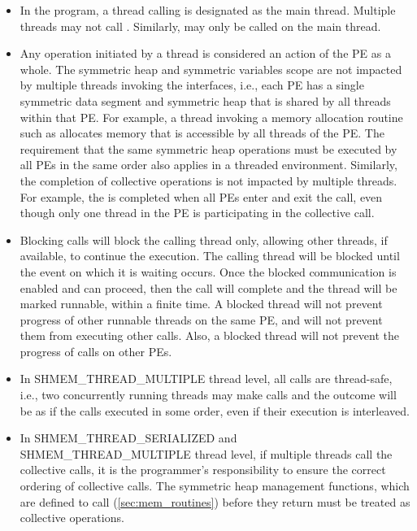 \begin{itemize}[leftmargin=*]

\item
In the \openshmem{} program, a thread calling  is designated as the main
thread. Multiple threads may not call . Similarly,
 may only be called on the main thread.

\item
Any \openshmem{} operation initiated by a thread is considered an action of the \ac{PE} as a whole.
The symmetric heap and symmetric variables scope
are not impacted by multiple threads invoking the
\openshmem{} interfaces, i.e., 
each \ac{PE} has a single symmetric data segment and symmetric heap that is shared by
all threads within that \ac{PE}.  For example, a thread invoking a memory allocation
routine such as  
allocates memory that is accessible by all threads of the \ac{PE}. 
The requirement that the same symmetric heap operations must
be executed by all \acp{PE} in the same order also applies in a threaded
environment. Similarly, the completion of collective operations is not impacted by multiple threads. 
For example, the  is completed when all \acp{PE} enter and
exit the  call, even though only one thread in the \ac{PE} is
participating in the collective call. 

\item Blocking \openshmem{} calls will block the calling thread only, allowing
other threads, if available, to continue the execution. The calling thread will be blocked until the
event on which it is waiting occurs. Once the blocked communication is enabled
and can proceed, then the call will complete and the thread will be marked
runnable, within a finite time. A blocked thread will not prevent progress of
other runnable threads on the same \ac{PE}, and will not prevent them from
executing other \openshmem{} calls. Also, a blocked thread will not prevent the
progress of \openshmem{} calls on other \acp{PE}. 

\item In SHMEM\_THREAD\_MULTIPLE thread level, all \openshmem{} calls are thread-safe, 
i.e., two concurrently running threads may make \openshmem{} calls and the outcome will be as if the calls executed in
some order, even if their execution is interleaved.


\item
In SHMEM\_THREAD\_SERIALIZED and SHMEM\_THREAD\_MULTIPLE thread level, 
if multiple threads call the collective calls, it is the programmer's responsibility to ensure the correct ordering of
collective calls.  The symmetric heap management functions, which are defined to call
(\ref{sec:mem_routines}) before they return 
must be treated as collective operations.


\end{itemize} 
